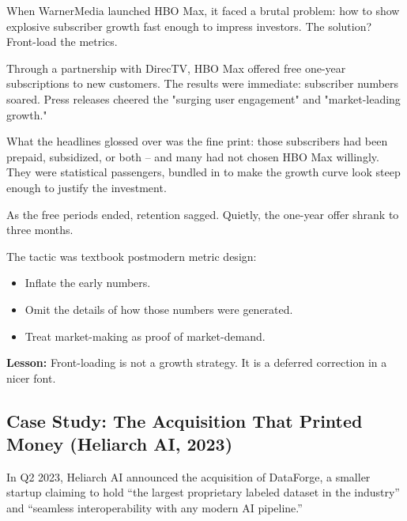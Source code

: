 \begin{tcolorbox}[colback=blue!5!white, colframe=blue!50!black,
  title={Historical Sidebar: Front-Loading the Future --- HBO Max and the Illusion of Instant Growth}]

When WarnerMedia launched HBO Max, it faced a brutal problem: how to show explosive subscriber growth fast enough to impress investors.  The solution? Front-load the metrics.

\medskip

Through a partnership with DirecTV, HBO Max offered free one-year subscriptions to new customers.  The results were immediate: subscriber numbers soared.  Press releases cheered the "surging user engagement" and "market-leading growth."

\medskip

What the headlines glossed over was the fine print: those subscribers had been prepaid, subsidized, or both -- and many had not chosen HBO Max willingly.  They were statistical passengers, bundled in to make the growth curve look steep enough to justify the investment.

\medskip

As the free periods ended, retention sagged. Quietly, the one-year offer shrank to three months.

\medskip

The tactic was textbook postmodern metric design:

\medskip

\begin{itemize}
    \item Inflate the early numbers.
    \item Omit the details of how those numbers were generated.
    \item Treat market-making as proof of market-demand.
\end{itemize}

\medskip

\textbf{Lesson:} Front-loading is not a growth strategy. It is a deferred correction in a nicer font.

\end{tcolorbox}


\subsection{Case Study: The Acquisition That Printed Money (Heliarch AI, 2023)}

In Q2 2023, Heliarch AI announced the acquisition of DataForge, a smaller startup claiming to hold “the largest proprietary labeled dataset in the industry” and “seamless interoperability with any modern AI pipeline.”

